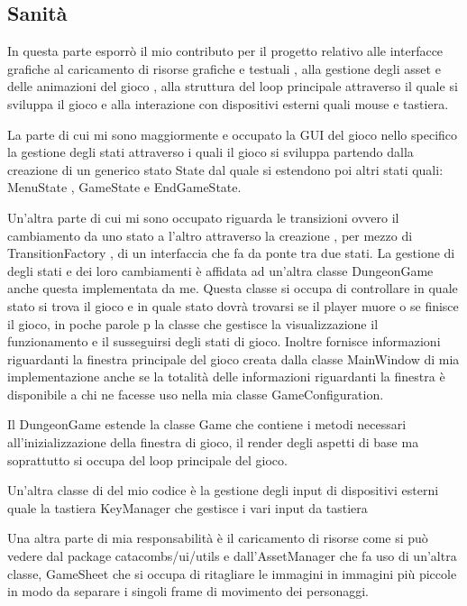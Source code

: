 \documentclass[a4paper,12pt]{report}
\begin{document}
    \subsection{Sanità}
    \par In questa parte esporrò il mio contributo per il progetto relativo alle interfacce grafiche al caricamento di risorse grafiche
    e testuali , alla gestione degli asset e delle animazioni del gioco , alla struttura del loop principale attraverso il quale si
    sviluppa il gioco e alla interazione con dispositivi esterni quali mouse e tastiera.
    \par La parte di cui mi sono maggiormente e occupato la GUI del gioco nello specifico la gestione degli stati attraverso i quali
    il gioco si sviluppa partendo dalla creazione di un generico stato State dal quale si estendono poi altri stati quali:
    MenuState , GameState e EndGameState.
    \par Un’altra parte di cui mi sono occupato riguarda le transizioni ovvero il cambiamento da uno stato a l’altro attraverso la creazione
    , per mezzo di  TransitionFactory , di un interfaccia che fa da ponte tra due stati. La gestione di degli stati e dei loro
    cambiamenti è affidata ad un'altra classe DungeonGame anche questa implementata da me. Questa classe si occupa di controllare
    in quale stato si trova il gioco e in quale stato dovrà trovarsi se il player muore o se finisce il gioco, in poche parole p la
    classe che gestisce la visualizzazione il funzionamento e il susseguirsi degli stati di gioco. Inoltre fornisce informazioni
    riguardanti la finestra principale del gioco creata dalla classe MainWindow di mia implementazione anche se la totalità delle
    informazioni riguardanti la finestra è disponibile a chi  ne facesse uso nella mia classe GameConfiguration.
    \par Il DungeonGame estende la classe Game che contiene i metodi necessari all’inizializzazione della finestra di gioco,
    il render degli aspetti di base ma soprattutto si occupa del loop principale del gioco.
    \par Un’altra classe di del mio codice è la gestione degli input di dispositivi esterni quale la tastiera KeyManager che
    gestisce i vari input da tastiera
    \par Una altra parte di mia responsabilità è il caricamento di risorse come si può vedere dal package catacombs/ui/utils
    e dall’AssetManager che fa uso di un’altra classe, GameSheet che si occupa di ritagliare le immagini in immagini più piccole
    in modo da separare i singoli frame di movimento dei personaggi.
\end{document}
